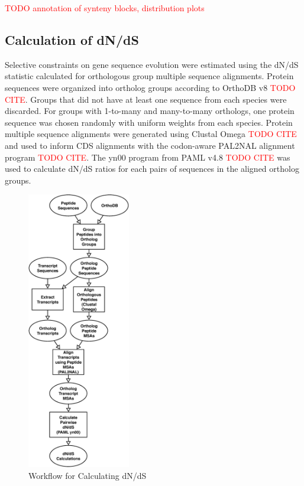 \textcolor{red}{TODO annotation of synteny blocks, distribution plots}

\subsection{Calculation of dN/dS}

Selective constraints on gene sequence evolution were estimated using the dN/dS statistic calculated for orthologous group multiple sequence alignments. 
Protein sequences were organized into ortholog groups according to OrthoDB v8 \textcolor{red}{TODO CITE}. Groups that did not have at least one sequence from each species were discarded.  For groups with 1-to-many and many-to-many orthologs, one protein sequence was chosen randomly with uniform weights from each species. Protein multiple sequence alignments were generated using Clustal Omega \textcolor{red}{TODO CITE} and used to inform CDS alignments with the codon-aware PAL2NAL alignment program \textcolor{red}{TODO CITE}.  The yn00 program from PAML v4.8 \textcolor{red}{TODO CITE} was used to calculate dN/dS ratios for each pairs of sequences in the aligned ortholog groups.

\begin{figure}[H]
  \centering
  \includegraphics[width=0.4\textwidth]{figures/ka_ks/PAML_workflow}
  \caption{Workflow for Calculating dN/dS}
  \label{fig:ka-ks-workflow}
\end{figure}

